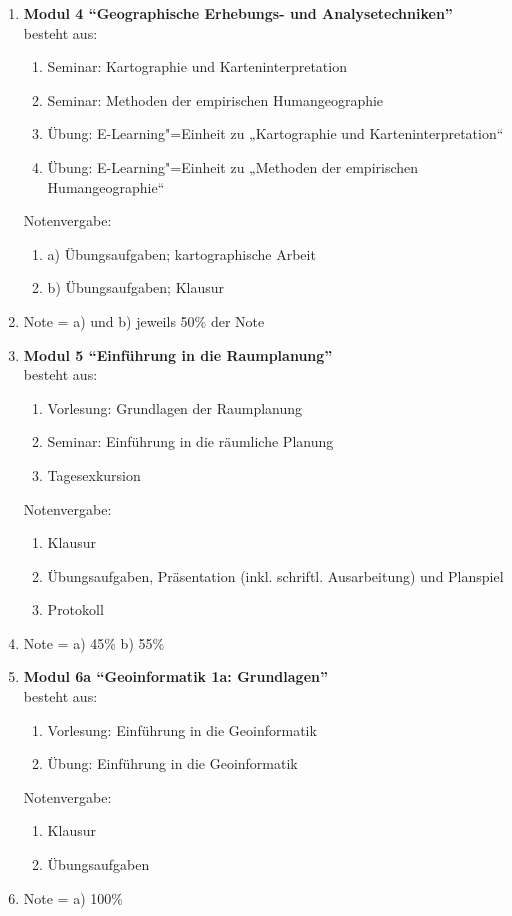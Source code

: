 \begin{enumerate}
 \item \textbf{Modul 4 ``Geographische Erhebungs- und Analysetechniken''}  \\ besteht aus:
  \begin{enumerate}
   \item Seminar: Kartographie und Karteninterpretation
   \item Seminar: Methoden der empirischen Humangeographie
   \item Übung: E-Learning"=Einheit zu „Kartographie und Karteninterpretation“
   \item Übung: E-Learning"=Einheit zu „Methoden der empirischen Humangeographie“
  \end{enumerate}
  Notenvergabe:
   \begin{enumerate}
    \item[] a) Übungsaufgaben; kartographische Arbeit
    \item[] b) Übungsaufgaben; Klausur
  \end{enumerate}
  \item[] Note = a) und b) jeweils 50\% der Note

 \item \textbf{Modul 5 ``Einführung in die Raumplanung''}  \\ besteht aus:
  \begin{enumerate}
   \item Vorlesung: Grundlagen der Raumplanung
   \item Seminar: Einführung in die räumliche Planung
   \item Tagesexkursion
  \end{enumerate}
  Notenvergabe:
  \begin{enumerate}
   \item Klausur
   \item Übungsaufgaben, Präsentation (inkl. schriftl. Ausarbeitung) und Planspiel
   \item Protokoll
  \end{enumerate}
  \item[] Note = a) 45\% b) 55\%

 \item \textbf{Modul 6a ``Geoinformatik 1a: Grundlagen''}  \\ besteht aus:
  \begin{enumerate}
   \item Vorlesung: Einführung in die Geoinformatik
   \item Übung: Einführung in die Geoinformatik
  \end{enumerate}
  Notenvergabe:
  \begin{enumerate}
   \item Klausur
   \item Übungsaufgaben
  \end{enumerate}
  \item[] Note = a) 100\%


\end{enumerate}
